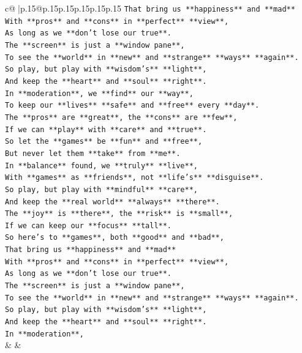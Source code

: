 \documentclass{article}
\begin{document}
{\begin{supertabular}{c@{$\;$}|p{.15\linewidth}@{}p{.15\linewidth}p{.15\linewidth}p{.15\linewidth}p{.15\linewidth}p{.15\linewidth}}
{{{\texttt{That bring us **happiness** and **mad**} \\
\texttt{With **pros** and **cons** in **perfect** **view**,} \\
\texttt{As long as we **don't lose our true**.} \\
\texttt{The **screen** is just a **window pane**,} \\
\texttt{To see the **world** in **new** and **strange** **ways** **again**.} \\
\texttt{So play, but play with **wisdom's** **light**,} \\
\texttt{And keep the **heart** and **soul** **right**.} \\
\texttt{In **moderation**, we **find** our **way**,} \\
\texttt{To keep our **lives** **safe** and **free** every **day**.} \\
\texttt{The **pros** are **great**, the **cons** are **few**,} \\
\texttt{If we can **play** with **care** and **true**.} \\
\texttt{So let the **games** be **fun** and **free**,} \\
\texttt{But never let them **take** from **me**.} \\
\texttt{In **balance** found, we **truly** **live**,} \\
\texttt{With **games** as **friends**, not **life's** **disguise**.} \\
\texttt{So play, but play with **mindful** **care**,} \\
\texttt{And keep the **real world** **always** **there**.} \\
\texttt{The **joy** is **there**, the **risk** is **small**,} \\
\texttt{If we can keep our **focus** **tall**.} \\
\texttt{So here's to **games**, both **good** and **bad**,} \\
\texttt{That bring us **happiness** and **mad**} \\
\texttt{With **pros** and **cons** in **perfect** **view**,} \\
\texttt{As long as we **don't lose our true**.} \\
\texttt{The **screen** is just a **window pane**,} \\
\texttt{To see the **world** in **new** and **strange** **ways** **again**.} \\
\texttt{So play, but play with **wisdom's** **light**,} \\
\texttt{And keep the **heart** and **soul** **right**.} \\
\texttt{In **moderation**,} \\
            }
        }
    }
    & & \\ \\


\end{supertabular}}
\end{document}
